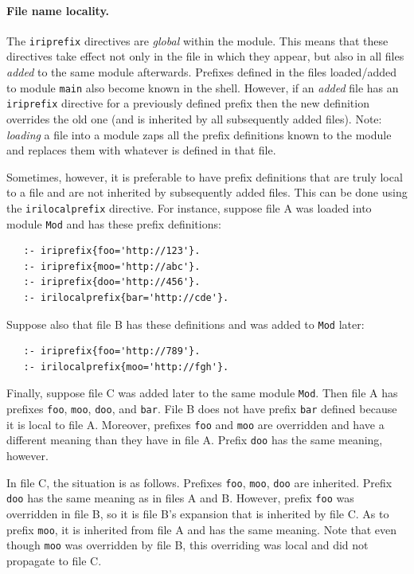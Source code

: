 \documentclass[11pt]{article}
\newcommand{\ERGO}{\mbox{\smaller{\ensuremath{\cal{E}}\smaller{{\sc{RGO}}}}}\xspace}
\newcommand{\FLSYSTEM}{\ERGO}
\begin{document}
\paragraph{File name locality.}
The \texttt{iriprefix}  directives are \emph{global} within the module. 
This means that these directives take effect not only in the file in which they appear,
but also in all files \emph{added} to the same module afterwards.
Prefixes defined in  the files loaded/added to module \texttt{main}  also
become known in the \FLSYSTEM shell. However, if an \emph{added} file has an
\texttt{iriprefix} directive for a previously defined prefix then the new
definition overrides the old one (and is inherited by all subsequently
added files). Note: \emph{loading}  a file into a module
zaps all the prefix definitions known  
to the module and replaces them with whatever is defined in that file.

Sometimes, however, it is preferable to have prefix definitions that are
truly local to a file and are not inherited by subsequently added files.
This can be done using the \texttt{irilocalprefix} directive. For instance,
suppose file A was loaded into module \texttt{Mod} and
has these prefix definitions:
\begin{verbatim}
   :- iriprefix{foo='http://123'}.
   :- iriprefix{moo='http://abc'}.
   :- iriprefix{doo='http://456'}.
   :- irilocalprefix{bar='http://cde'}.
\end{verbatim}
Suppose also that file B has these definitions and was added to
\texttt{Mod} later: 
\begin{verbatim}
   :- iriprefix{foo='http://789'}.
   :- irilocalprefix{moo='http://fgh'}.
\end{verbatim}
Finally, suppose file C was added later to the same module \texttt{Mod}.
Then file A has prefixes \texttt{foo}, \texttt{moo}, \texttt{doo}, and
\texttt{bar}. File B does not have prefix \texttt{bar} defined because it
is local to file A. Moreover, prefixes \texttt{foo} and \texttt{moo} are
overridden and have a different meaning than they have in file A. Prefix
\texttt{doo} has the same meaning, however.

In file C, the situation is as follows. Prefixes \texttt{foo},
\texttt{moo}, \texttt{doo} are inherited. Prefix \texttt{doo} has the same
meaning as in files A and B. However, prefix \texttt{foo} was overridden
in file B, so it is file B's expansion that is inherited by file C.
As to prefix \texttt{moo}, it is inherited from file A and has the same
meaning. Note that even though \texttt{moo} was overridden by file B, this
overriding was local and did not propagate to file C.  
\end{document}
